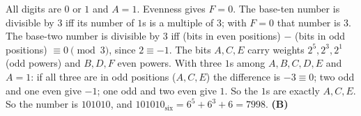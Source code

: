 All digits are $0$ or $1$ and $A=1$. Evenness gives $F=0$. The base-ten number is divisible by $3$ iff its number of $1$s is a multiple of $3$; with $F=0$ that number is $3$. The base-two number is divisible by $3$ iff (bits in even positions) $-$ (bits in odd positions) $\equiv0\pmod3$, since $2\equiv-1$. The bits $A,C,E$ carry weights $2^5,2^3,2^1$ (odd powers) and $B,D,F$ even powers. With three $1$s among $A,B,C,D,E$ and $A=1$: if all three are in odd positions ($A,C,E$) the difference is $-3\equiv0$; two odd and one even give $-1$; one odd and two even give $1$. So the $1$s are exactly $A,C,E$. So the number is $101010$, and $101010_{\text{six}}=6^5+6^3+6=7998$. \textbf{(B)}
